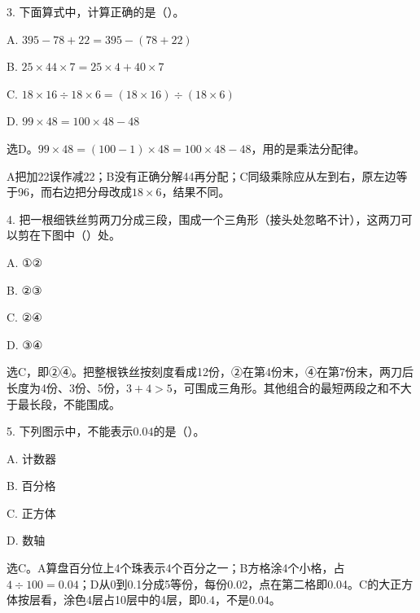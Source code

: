 3. 下面算式中，计算正确的是（\hspace{1.8em}）。\par
\noindent A. \(395-78+22=395-(78+22)\)\par
\noindent B. \(25\times44\times7=25\times4+40\times7\)\par
\noindent C. \(18\times16\div18\times6=(18\times16)\div(18\times6)\)\par
\noindent D. \(99\times48=100\times48-48\)\par
\begin{BookAnswer}
选D。\(99\times48=(100-1)\times48=100\times48-48\)，用的是乘法分配律。\par A把加22误作减22；B没有正确分解44再分配；C同级乘除应从左到右，原左边等于96，而右边把分母改成\(18\times6\)，结果不同。
\end{BookAnswer}

4. 把一根细铁丝剪两刀分成三段，围成一个三角形（接头处忽略不计），这两刀可以剪在下图中（\hspace{1.8em}）处。\par
\noindent A. ①②\par
\noindent B. ②③\par
\noindent C. ②④\par
\noindent D. ③④\par
{}
\begin{BookAnswer}
选C，即②④。把整根铁丝按刻度看成12份，②在第4份末，④在第7份末，两刀后长度为4份、3份、5份，\allowbreak{}\(3+4>5\)，可围成三角形。其他组合的最短两段之和不大于最长段，不能围成。
\end{BookAnswer}

5. 下列图示中，不能表示\(0.04\)的是（\hspace{1.8em}）。\par
\noindent A. 计数器\par
\noindent B. 百分格\par
\noindent C. 正方体\par
\noindent D. 数轴\par
{}
\begin{BookAnswer}
选C。A算盘百分位上4个珠表示4个百分之一；B方格涂4个小格，占\(4\div100=0.04\)；D从0到0.1分成5等份，每份0.02，点在第二格即0.04。C的大正方体按层看，涂色4层占10层中的4层，即\(0.4\)，不是\(0.04\)。
\end{BookAnswer}

